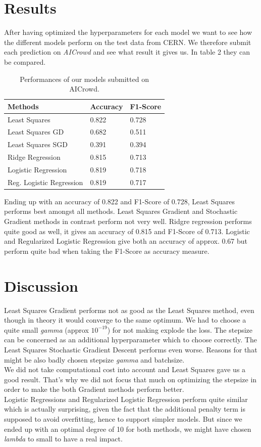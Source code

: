 \documentclass[10pt,conference,compsocconf]{IEEEtran}
\begin{document}
\newpage

\section{Results}


After having optimized the hyperparameters for each model we want to see how the different models perform on the test data from CERN. We therefore submit each prediction on \textit{AICrowd} and see what result it gives us. In table 2 they can be compared.


\begin{table}[h]
	\centering
	\begin{tabular}[c]{|l||l|l|}
		\hline
		Methods&Accuracy&F1-Score\\
	\hline
	Least Squares&0.822&0.728\\
	Least Squares GD&0.682&0.511\\
	Least Squares SGD&0.391&0.394\\		
	Ridge Regression&0.815&0.713\\
	Logistic Regression&0.819&0.718\\
	Reg. Logistic Regression&0.819&0.717\\
	\hline
	\end{tabular}
	\caption{Performances of our models submitted on AICrowd.}
	\label{tab:perform}
\end{table}

Ending up with an accuracy of 0.822 and F1-Score of 0.728, Least Squares performs best amongst all methods. Least Squares Gradient and Stochastic Gradient methods in contrast perform not very well. 
Ridgre regression performs quite good as well, it gives an accuracy of 0.815 and F1-Score of 0.713.
Logistic and Regularized Logistic Regression give both an accuracy of approx. 0.67 but perform quite bad when taking the F1-Score as accuracy measure. 


\section{Discussion}

 
Least Squares Gradient performs not as good as the Least Squares method, even though in theory it would converge to the same optimum. We had to choose a quite small \textit{gamma} (approx $10^{-19}$) for not making explode the loss. The stepsize can be concerned as an additional hyperparameter which to choose correctly. The Least Squares Stochastic Gradient Descent performs even worse. Reasons for that might be also badly chosen stepsize \textit{gamma} and batchsize.\\
We did not take computational cost into account and Least Squares gave us a good result. That's why we did not focus that much on optimizing the stepsize in order to make the both Gradient methods perform better. \\
Logistic Regressions and Regularized Logistic Regression perform quite similar which is actually surprising, given the fact that the additional penalty term is supposed to avoid overfitting, hence to support simpler models. But since we ended up with an optimal degree of 10 for both methods, we might have chosen \textit{lambda} to small to have a real impact.
\end{document}
